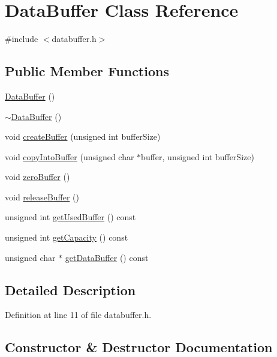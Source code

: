 \hypertarget{class_data_buffer}{}\section{Data\+Buffer Class Reference}
\label{class_data_buffer}


{\ttfamily \#include $<$databuffer.\+h$>$}

\subsection*{Public Member Functions}
\begin{DoxyCompactItemize}
\item 
\mbox{\hyperlink{class_data_buffer_a83f823dc058fe550713806bb49dd9651}{Data\+Buffer}} ()
\item 
\mbox{\hyperlink{class_data_buffer_ac374f86810cc019a248be28d1babecdb}{$\sim$\+Data\+Buffer}} ()
\item 
void \mbox{\hyperlink{class_data_buffer_a8b1617a03808b96bc6658e21497fb4d5}{create\+Buffer}} (unsigned int buffer\+Size)
\item 
void \mbox{\hyperlink{class_data_buffer_ace8e72da6186e807b6826e1b63597a01}{copy\+Into\+Buffer}} (unsigned char $\ast$buffer, unsigned int buffer\+Size)
\item 
void \mbox{\hyperlink{class_data_buffer_a2b0461459480fdac78e72372f9f140ce}{zero\+Buffer}} ()
\item 
void \mbox{\hyperlink{class_data_buffer_a4ee5f10e8bb45c33011ca78d2b270785}{release\+Buffer}} ()
\item 
unsigned int \mbox{\hyperlink{class_data_buffer_a6f4e74b3e149556173b8fbd84d76111d}{get\+Used\+Buffer}} () const
\item 
unsigned int \mbox{\hyperlink{class_data_buffer_a0cf7a4f1fcba3f12053dd08985a08c20}{get\+Capacity}} () const
\item 
unsigned char $\ast$ \mbox{\hyperlink{class_data_buffer_ade34e6e14e59046a1ed42db1588ed8cb}{get\+Data\+Buffer}} () const
\end{DoxyCompactItemize}


\subsection{Detailed Description}


Definition at line 11 of file databuffer.\+h.



\subsection{Constructor \& Destructor Documentation}
\mbox{\label{class_data_buffer_a83f823dc058fe550713806bb49dd9651}} 
